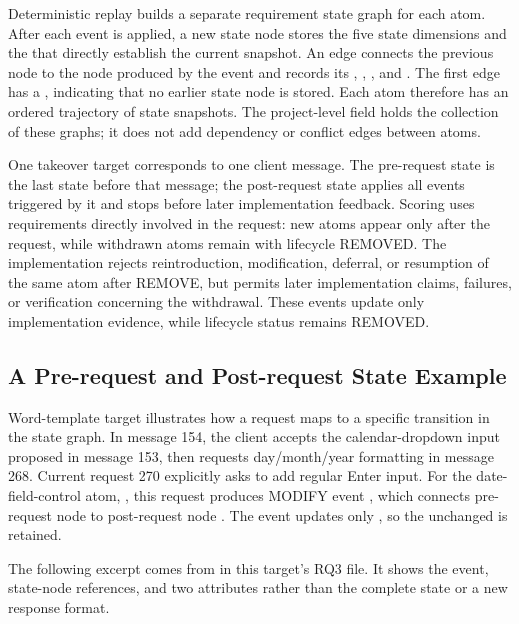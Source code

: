 \documentclass{article} %
\begin{document}
Deterministic replay builds a separate requirement state graph for each atom. After each event is applied, a new state node stores the five state dimensions and the  that directly establish the current snapshot. An edge connects the previous node to the node produced by the event and records its , , , and . The first edge has a  , indicating that no earlier state node is stored. Each atom therefore has an ordered trajectory of state snapshots. The project-level  field holds the collection of these graphs; it does not add dependency or conflict edges between atoms.

One takeover target corresponds to one client message. The pre-request state is the last state before that message; the post-request state applies all events triggered by it and stops before later implementation feedback. Scoring uses requirements directly involved in the request: new atoms appear only after the request, while withdrawn atoms remain with lifecycle REMOVED. The implementation rejects reintroduction, modification, deferral, or resumption of the same atom after REMOVE, but permits later implementation claims, failures, or verification concerning the withdrawal. These events update only implementation evidence, while lifecycle status remains REMOVED.

\FloatBarrier
\subsection{A Pre-request and Post-request State Example}
\label{app:a2}

Word-template target  illustrates how a request maps to a specific transition in the state graph. In message 154, the client accepts the calendar-dropdown input proposed in message 153, then requests day/month/year formatting in message 268. Current request 270 explicitly asks to add regular Enter input. For the date-field-control atom, , this request produces MODIFY event , which connects pre-request node  to post-request node . The event updates only , so the unchanged  is retained.

The following excerpt comes from  in this target's RQ3 file. It shows the event, state-node references, and two attributes rather than the complete state or a new response format.
\end{document}
